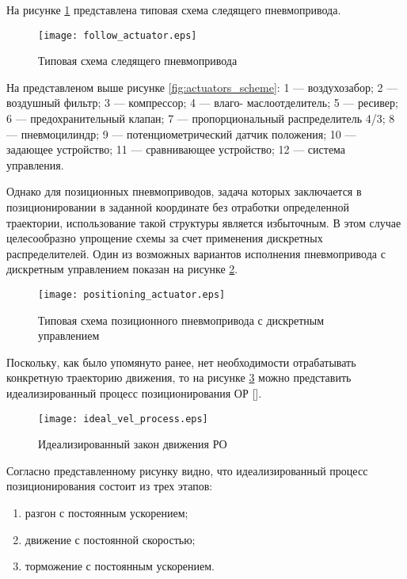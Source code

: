 На рисунке \ref*{fig:template_pneumatic_actuator} представлена типовая схема следящего пневмопривода.

\begin{figure}[h]
    \centerfloat
    \texttt{[image: follow\_actuator.eps]}
    \caption{Типовая схема следящего пневмопривода}\label{fig:template_pneumatic_actuator}
\end{figure}
На представленом выше рисунке \ref*{fig:actuators_scheme}: 1 --- воздухозабор; 2 --- воздушный фильтр; 3 --- компрессор;
4 --- влаго- маслоотделитель; 5 --- ресивер; 6 --- предохранительный клапан; 7 --- пропорциональный
распределитель 4/3; 8 --- пневмоцилиндр; 9 --- потенциометрический датчик положения;
10 --- задающее устройство; 11 --- сравнивающее устройство; 12 --- система управления.

Однако для позиционных пневмоприводов, задача которых заключается в
позиционировании в заданной координате без отработки определенной траектории,
использование такой структуры является избыточным. В этом случае целесообразно
упрощение схемы за счет применения дискретных распределителей. Один из возможных вариантов исполнения пневмопривода
с дискретным управлением показан на рисунке
\ref*{fig:template_discrete_pneumatic_actuator}.

\begin{figure}[h]
    \centerfloat
    \texttt{[image: positioning\_actuator.eps]}
    \caption{Типовая схема позиционного пневмопривода с дискретным управлением}\label{fig:template_discrete_pneumatic_actuator}
\end{figure}

Поскольку, как было упомянуто ранее, нет необходимости отрабатывать конкретную траекторию движения,
то на рисунке \ref*{fig:ideal_vel_process} можно представить идеализированный процесс позиционирования ОР [].

\begin{figure}[h]
    \centerfloat
    \texttt{[image: ideal\_vel\_process.eps]}
    \caption{Идеализированный закон движения РО}\label{fig:ideal_vel_process}
\end{figure}


Согласно представленному рисунку видно, что идеализированный процесс позиционирования состоит из трех этапов:

\begin{enumerate}
    \item разгон с постоянным ускорением;
    \item движение с постоянной скоростью;
    \item торможение с постоянным ускорением.
\end{enumerate}

